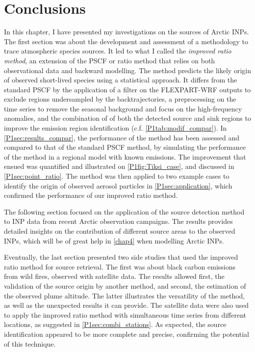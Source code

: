 \section{Conclusions}
In this chapter, I have presented my investigations on the sources of Arctic INPs.
The first section was about the development and assessment of a methodology to trace atmospheric species sources. It led to what I called the \textit{improved ratio method}, an extension of the PSCF or ratio method that relies on both observational data and backward modelling. The method predicts the likely origin of observed short-lived species using a statistical approach. 
It differs from the standard PSCF by the application of a filter on the FLEXPART-WRF outputs to exclude regions undersampled by the backtrajectories, a preprocessing on the time series to remove the seasonal background and focus on the high-frequency anomalies, and the combination of of both the detected source and sink regions to improve the emission region identification (c.f. \cref{P1tab:modif_compar}). 
In \cref{P1sec:results_compar}, the performance of the method has been assessed and compared to that of the standard PSCF method, by simulating the performance of the method in a regional model with known emissions. The improvement that ensued was quantified and illustrated on \cref{P1fig:Tiksi_case}, and discussed in \cref{P1sec:point_ratio}.  
The method was then applied to two example cases to identify the origin of observed aerosol particles in \cref{P1sec:application}, which confirmed the performance of our improved ratio method.

The following section focused on the application of the source detection method to INP data from recent Arctic observation campaigns.
The results provides detailed insights on the contribution of different source areas to the observed INPs, which will be of great help in \cref{chap4} when modelling Arctic INPs. 

Eventually, the last section presented two side studies that used the improved ratio method for source retrieval. The first was about black carbon emissions from wild fires, observed with satellite data. 
The results allowed first, the validation of the source origin by another method, and second, the estimation of the observed plume altitude. The latter illustrates the versatility of the method, as well as the unexpected results it can provide.
The satellite data were also used to apply the improved ratio method with simultaneous time series from different locations, as suggested in \cref{P1sec:combi_stations}. As expected, the source identification appeared to be more complete and precise, confirming the potential of this technique.

